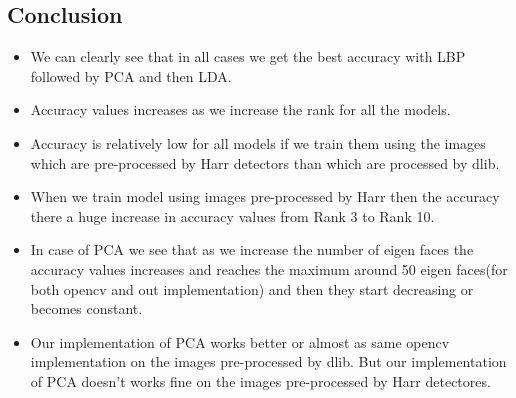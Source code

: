 \subsection{Conclusion}
\begin{itemize}
    \item We can clearly see that in all cases we get the best accuracy with LBP followed by PCA and then LDA.
    \item Accuracy values increases as we increase the rank for all the models.
    \item Accuracy is relatively low for all models if we train them using the images which are pre-processed by Harr detectors than which are processed by dlib.
    \item When we train model using images pre-processed by Harr then the accuracy there a huge increase in accuracy values from Rank 3 to Rank 10.
    \item In case of PCA we see that as we increase the number of eigen faces the accuracy values increases and reaches the maximum around 50 eigen faces(for both opencv and out implementation) and then they start decreasing or becomes constant.
    \item Our implementation of PCA works better or almost as same opencv implementation on the images pre-processed by dlib. But our implementation of PCA doesn't works fine on the images pre-processed by Harr detectores.
\end{itemize}

